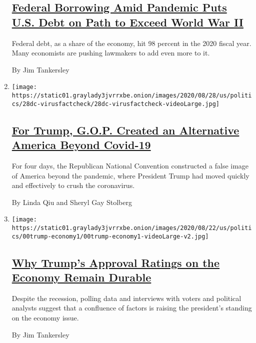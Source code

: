 \begin{enumerate}
  \hypertarget{federal-borrowing-amid-pandemic-puts-us-debt-on-path-to-exceed-world-war-ii}{%
  \subsection{\texorpdfstring{\href{/2020/09/02/business/us-federal-debt.html}{Federal
  Borrowing Amid Pandemic Puts U.S. Debt on Path to Exceed World War
  II}}{Federal Borrowing Amid Pandemic Puts U.S. Debt on Path to Exceed World War II}}\label{federal-borrowing-amid-pandemic-puts-us-debt-on-path-to-exceed-world-war-ii}}

  Federal debt, as a share of the economy, hit 98 percent in the 2020
  fiscal year. Many economists are pushing lawmakers to add even more to
  it.

  By Jim Tankersley
\item
  \texttt{[image: https://static01.graylady3jvrrxbe.onion/images/2020/08/28/us/politics/28dc-virusfactcheck/28dc-virusfactcheck-videoLarge.jpg]}

  \hypertarget{for-trump-gop-created-an-alternative-america-beyond-covid-19}{%
  \subsection{\texorpdfstring{\href{/2020/08/28/us/politics/trump-coronavirus-fact-check.html}{For
  Trump, G.O.P. Created an Alternative America Beyond
  Covid-19}}{For Trump, G.O.P. Created an Alternative America Beyond Covid-19}}\label{for-trump-gop-created-an-alternative-america-beyond-covid-19}}

  For four days, the Republican National Convention constructed a false
  image of America beyond the pandemic, where President Trump had moved
  quickly and effectively to crush the coronavirus.

  By Linda Qiu and Sheryl Gay Stolberg
\item
  \texttt{[image: https://static01.graylady3jvrrxbe.onion/images/2020/08/22/us/politics/00trump-economy1/00trump-economy1-videoLarge-v2.jpg]}

  \hypertarget{why-trumps-approval-ratings-on-the-economy-remain-durable}{%
  \subsection{\texorpdfstring{\href{/2020/08/24/us/politics/trump-economy.html}{Why
  Trump's Approval Ratings on the Economy Remain
  Durable}}{Why Trump's Approval Ratings on the Economy Remain Durable}}\label{why-trumps-approval-ratings-on-the-economy-remain-durable}}

  Despite the recession, polling data and interviews with voters and
  political analysts suggest that a confluence of factors is raising the
  president's standing on the economy issue.

  By Jim Tankersley
\end{enumerate}

